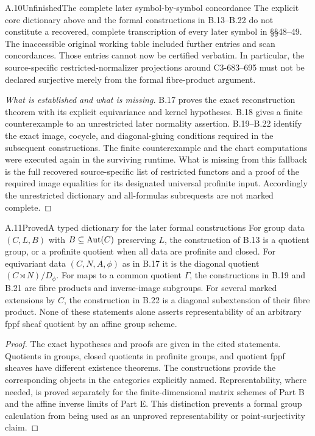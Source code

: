 \begin{statement}{A.10}{Unfinished}{The complete later symbol-by-symbol concordance}
The explicit core dictionary above and the formal constructions
in B.13--B.22 do not constitute a recovered, complete transcription
of every later symbol in §§48--49. The inaccessible original
working table included further entries and scan concordances.
Those entries cannot now be certified verbatim.
In particular, the source-specific restricted-normalizer
projections around C3-683--695 must not be declared surjective
merely from the formal fibre-product argument.
\end{statement}
\begin{proof}[What is established and what is missing]
B.17 proves the exact reconstruction theorem with its explicit
equivariance and kernel hypotheses. B.18 gives a finite
counterexample to an unrestricted later normality assertion.
B.19--B.22 identify the exact image, cocycle, and diagonal-gluing
conditions required in the subsequent constructions.
The finite counterexample and the chart computations were
executed again in the surviving runtime.
What is missing from this fallback is the full recovered
source-specific list of restricted functors and a proof of
the required image equalities for its designated universal
profinite input. Accordingly the unrestricted dictionary and
all-formulas subrequests are not marked complete.
\end{proof}

\begin{statement}{A.11}{Proved}{A typed dictionary for the later formal constructions}
For group data $(C,L,B)$ with $B\subseteq\operatorname{Aut}(C)$ preserving $L$,
the construction of B.13 is a quotient group, or a profinite
quotient when all data are profinite and closed.
For equivariant data $(C,N,A,\phi)$ as in B.17 it is the
diagonal quotient $(C\rtimes N)/D_\phi$.
For maps to a common quotient $\Gamma$, the constructions in
B.19 and B.21 are fibre products and inverse-image subgroups.
For several marked extensions by $C$, the construction in B.22
is a diagonal subextension of their fibre product.
None of these statements alone asserts representability of an
arbitrary fppf sheaf quotient by an affine group scheme.
\end{statement}
\begin{proof}
The exact hypotheses and proofs are given in the cited statements.
Quotients in groups, closed quotients in profinite groups, and
quotient fppf sheaves have different existence theorems.
The constructions provide the corresponding objects in the
categories explicitly named. Representability, where needed,
is proved separately for the finite-dimensional matrix schemes
of Part B and the affine inverse limits of Part E.
This distinction prevents a formal group calculation from being
used as an unproved representability or point-surjectivity claim.
\end{proof}
